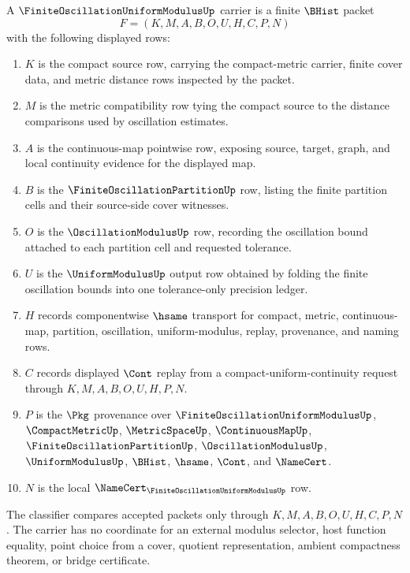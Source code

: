 \begin{definition}
\label{def:finite-oscillation-uniform-modulus-carrier}
A $\FiniteOscillationUniformModulusUp$ carrier is a finite $\BHist$ packet
$$
F=(K,M,A,B,O,U,H,C,P,N)
$$
with the following displayed rows:
\begin{enumerate}
\item $K$ is the compact source row, carrying the compact-metric carrier, finite cover data, and metric distance rows inspected by the packet.
\item $M$ is the metric compatibility row tying the compact source to the distance comparisons used by oscillation estimates.
\item $A$ is the continuous-map pointwise row, exposing source, target, graph, and local continuity evidence for the displayed map.
\item $B$ is the $\FiniteOscillationPartitionUp$ row, listing the finite partition cells and their source-side cover witnesses.
\item $O$ is the $\OscillationModulusUp$ row, recording the oscillation bound attached to each partition cell and requested tolerance.
\item $U$ is the $\UniformModulusUp$ output row obtained by folding the finite oscillation bounds into one tolerance-only precision ledger.
\item $H$ records componentwise $\hsame$ transport for compact, metric, continuous-map, partition, oscillation, uniform-modulus, replay, provenance, and naming rows.
\item $C$ records displayed $\Cont$ replay from a compact-uniform-continuity request through $K,M,A,B,O,U,H,P,N$.
\item $P$ is the $\Pkg$ provenance over $\FiniteOscillationUniformModulusUp$, $\CompactMetricUp$, $\MetricSpaceUp$, $\ContinuousMapUp$, $\FiniteOscillationPartitionUp$, $\OscillationModulusUp$, $\UniformModulusUp$, $\BHist$, $\hsame$, $\Cont$, and $\NameCert$.
\item $N$ is the local $\NameCert_{\FiniteOscillationUniformModulusUp}$ row.
\end{enumerate}
The classifier compares accepted packets only through $K,M,A,B,O,U,H,C,P,N$. The carrier has no coordinate for an external modulus selector, host function equality, point choice from a cover, quotient representation, ambient compactness theorem, or bridge certificate.
\end{definition}

